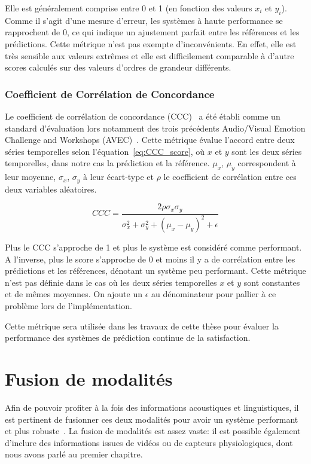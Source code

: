 Elle est généralement comprise entre 0 et 1 (en fonction des valeurs $x_i$ et $y_i$). Comme il s'agit d'une mesure d'erreur, les systèmes à haute performance se rapprochent de 0, ce qui indique un ajustement parfait entre les références et les prédictions. Cette métrique n'est pas exempte d'inconvénients. En effet, elle est très sensible aux valeurs extrêmes et elle est difficilement comparable à d'autre scores calculés sur des valeurs d'ordres de grandeur différents.

\subsubsection{Coefficient de Corrélation de Concordance}
Le coefficient de corrélation de concordance (CCC)~\cite{CCC} a été établi comme un standard d'évaluation lors notamment des trois précédents Audio/Visual Emotion Challenge and Workshops (AVEC)~\cite{AVEC2017,AVEC2018,AVEC2019}. Cette métrique évalue l'accord entre deux séries temporelles selon l'équation~\ref{eq:CCC_score}, où $x$ et $y$ sont les deux séries temporelles, dans notre cas la prédiction et la référence. $\mu_x$, $\mu_y$ correspondent à leur moyenne, $\sigma_x$, $\sigma_y$ à leur écart-type et $\rho$ le coefficient de corrélation entre ces deux variables aléatoires.

 \begin{equation}
    CCC = \frac{2\rho\sigma_x\sigma_y}{\sigma_x^2 + \sigma_y^2 + (\mu_x - \mu_y)^2 + \epsilon}
 \label{eq:CCC_score}
 \end{equation}

Plus le CCC s'approche de 1 et plus le système est considéré comme performant. A l'inverse, plus le score s'approche de 0 et moins il y a de corrélation entre les prédictions et les références, dénotant un système peu performant.
Cette métrique n'est pas définie dans le cas où les deux séries temporelles $x$ et $y$ sont constantes et de mêmes moyennes. On ajoute un $\epsilon$ au dénominateur pour pallier à ce problème lors de l'implémentation.

Cette métrique sera utilisée dans les travaux de cette thèse pour évaluer la performance des systèmes de prédiction continue de la satisfaction. %

\section{Fusion de modalités}
Afin de pouvoir profiter à la fois des informations acoustiques et linguistiques, il est pertinent de fusionner ces deux modalités pour avoir un système performant et plus robuste~\cite{Wollmer2013,Alam2014,Atrey2010,Liu2018}. La fusion de modalités est assez vaste: il est possible également d'inclure des informations issues de vidéos ou de capteurs physiologiques, dont nous avons parlé au premier chapitre.

